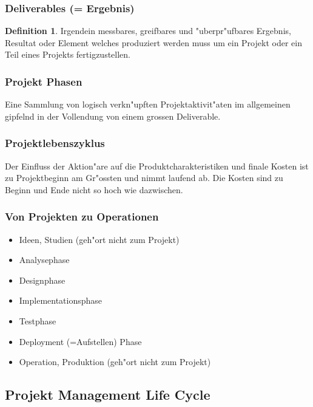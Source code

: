 \documentclass[german, 10pt, a4paper, twocolumn]{scrartcl}
\theoremstyle{definition}
\newtheorem*{definition}{Definition}
\begin{document}
\subsubsection{Deliverables (= Ergebnis)}

\begin{definition}
	Irgendein messbares, greifbares und "uberpr"ufbares Ergebnis, Resultat oder Element welches produziert werden muss um ein Projekt oder ein Teil eines Projekts fertigzustellen.
\end{definition}

\subsubsection{Projekt Phasen}

Eine Sammlung von logisch verkn"upften Projektaktivit"aten im allgemeinen gipfelnd in der Vollendung von einem grossen Deliverable.

\subsubsection{Projektlebenszyklus}

Der Einfluss der Aktion"are auf die Produktcharakteristiken und finale Kosten ist zu Projektbeginn am Gr"ossten und nimmt laufend ab. Die Kosten sind zu Beginn und Ende nicht so hoch wie dazwischen.

\subsubsection{Von Projekten zu Operationen}

\begin{itemize}
	\item Ideen, Studien (geh"ort nicht zum Projekt)
	\item Analysephase
	\item Designphase
	\item Implementationsphase
	\item Testphase
	\item Deployment (=Aufstellen) Phase
	\item Operation, Produktion (geh"ort nicht zum Projekt)
\end{itemize}

\subsection{Projekt Management Life Cycle}
\end{document}
